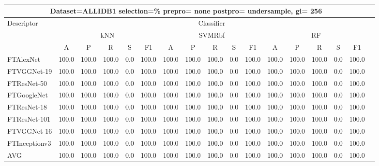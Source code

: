 \documentclass[12pt,italian]{article}
\begin{document}
\begin{tiny}
\begin{longtable}{lcccccccccccccccc}
\toprule
\multicolumn{16}{c}{Dataset=ALLIDB1 selection=\% prepro= none postpro= undersample, gl= 256} \\ 
\toprule
Descriptor & \multicolumn{15}{c}{Classifier} \\ 
& \multicolumn{5}{c}{kNN} & \multicolumn{5}{c}{SVMRbf} & \multicolumn{5}{c}{RF} \\ 
& A & P & R & S & F1 & A & P & R & S & F1 & A & P & R & S & F1 \\ 
\midrule
FTAlexNet & 100.0 & 100.0 & 100.0 &  0.0 & 100.0 & 100.0 & 100.0 & 100.0 &  0.0 & 100.0 & 100.0 & 100.0 & 100.0 &  0.0 & 100.0 \\ 
FTVGGNet-19 & 100.0 & 100.0 & 100.0 &  0.0 & 100.0 & 100.0 & 100.0 & 100.0 &  0.0 & 100.0 & 100.0 & 100.0 & 100.0 &  0.0 & 100.0 \\ 
FTResNet-50 & 100.0 & 100.0 & 100.0 &  0.0 & 100.0 & 100.0 & 100.0 & 100.0 &  0.0 & 100.0 & 100.0 & 100.0 & 100.0 &  0.0 & 100.0 \\ 
FTGoogleNet & 100.0 & 100.0 & 100.0 &  0.0 & 100.0 & 100.0 & 100.0 & 100.0 &  0.0 & 100.0 & 100.0 & 100.0 & 100.0 &  0.0 & 100.0 \\ 
FTResNet-18 & 100.0 & 100.0 & 100.0 &  0.0 & 100.0 & 100.0 & 100.0 & 100.0 &  0.0 & 100.0 & 100.0 & 100.0 & 100.0 &  0.0 & 100.0 \\ 
FTResNet-101 & 100.0 & 100.0 & 100.0 &  0.0 & 100.0 & 100.0 & 100.0 & 100.0 &  0.0 & 100.0 & 100.0 & 100.0 & 100.0 &  0.0 & 100.0 \\ 
FTVGGNet-16 & 100.0 & 100.0 & 100.0 &  0.0 & 100.0 & 100.0 & 100.0 & 100.0 &  0.0 & 100.0 & 100.0 & 100.0 & 100.0 &  0.0 & 100.0 \\ 
FTInceptionv3 & 100.0 & 100.0 & 100.0 &  0.0 & 100.0 & 100.0 & 100.0 & 100.0 &  0.0 & 100.0 & 100.0 & 100.0 & 100.0 &  0.0 & 100.0 \\ 
\hline
AVG & 100.0 & 100.0 & 100.0 &  0.0 & 100.0 & 100.0 & 100.0 & 100.0 &  0.0 & 100.0 & 100.0 & 100.0 & 100.0 &  0.0 & 100.0 \\ 
\hline
\bottomrule
\end{longtable} 


\end{tiny}
\end{document}
